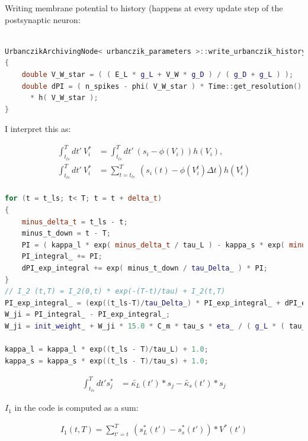 \documentclass[12pt,a4paper,titlepage]{report}
\begin{document}
Writing membrane potential to history (happens at every update step of the postsynaptic neuron:

\begin{lstlisting}[language=C++, directivestyle={\color{black}}
                   emph={int,char,double,float,unsigned,exp},
                   emphstyle={\color{blue}}]

UrbanczikArchivingNode< urbanczik_parameters >::write_urbanczik_history(Time t, double V_W, int n_spikes, int comp)
{
	double V_W_star = ( ( E_L * g_L + V_W * g_D ) / ( g_D + g_L ) );
	double dPI = ( n_spikes - phi( V_W_star ) * Time::get_resolution().get_ms() )
      * h( V_W_star );
}\end{lstlisting}

I interpret this as:


\begin{align*}
\int_{t_{ls}}^T dt' \ V_i^* &= \int_{t_{ls}}^T dt' \  (s_i - \phi(V_i )) h(V_i),\\
\int_{t_{ls}}^T dt' \ V_i^* &= \sum_{t=t_{ls}}^T \  (s_i(t) -  \phi(V_i^t ) \Delta t) h(V_i^t)\\
\end{align*}

\begin{lstlisting}[language=C++, directivestyle={\color{black}}
                   emph={int,char,double,float,unsigned,exp},
                   emphstyle={\color{blue}}]
for (t = t_ls; t< T; t = t + delta_t)
{
   	minus_delta_t = t_ls - t;
    minus_t_down = t - T;
    PI = ( kappa_l * exp( minus_delta_t / tau_L ) - kappa_s * exp( minus_delta_t / tau_s ) ) * V_star(t);
    PI_integral_ += PI;
    dPI_exp_integral += exp( minus_t_down / tau_Delta_ ) * PI;
}  
// I_2 (t,T) = I_2(0,t) * exp(-(T-t)/tau) + I_2(t,T)
PI_exp_integral_ = (exp((t_ls-T)/tau_Delta_) * PI_exp_integral_ + dPI_exp_integral);
W_ji = PI_integral_ - PI_exp_integral_;
W_ji = init_weight_ + W_ji * 15.0 * C_m * tau_s * eta_ / ( g_L * ( tau_L - tau_s ) );    
  
kappa_l = kappa_l * exp((t_ls - T)/tau_L) + 1.0;
kappa_s = kappa_s * exp((t_ls - T)/tau_s) + 1.0;
  \end{lstlisting}


\begin{align*}
\int_{t_{ls}}^T dt' s_j^* &=  \tilde{\kappa_L}(t') * s_j -  \tilde{\kappa_s}(t') * s_j
\end{align*}

$I_1$ in the code is computed as a sum:

\begin{align}
I_1 (t,T) = \sum_{t'=t}^T \ (s_L^*(t') - s_s^*(t')) * V^*(t') 
\end{align}
\end{document}
